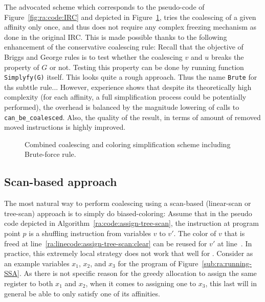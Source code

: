 {The advocated scheme which corresponds to the pseudo-code of Figure~\ref{fig:ra:code:IRC} and depicted in Figure~\ref{fig:ra:brute}, tries the coalescing of a given affinity only once, and thus does not require any complex freezing mechanism as done in the original IRC.
This is made possible thanks to the following enhancement of the conservative coalescing rule:
Recall that the objective of Briggs and George rules is to test whether the coalescing $v$ and $u$ breaks the  property of $G$ or not.
Testing this property can be done by running function \verb+Simplyfy(G)+ itself.
This looks quite a rough approach.
Thus the name \verb+Brute+ for ths subttle rule...
However, experience shows that despite its theoretically high complexity (for each affinity, a full simplification process could be potentially performed), the overhead is balanced by the magnitude lowering of calls to \verb+can_be_coalesced+.
Also, the quality of the result, in terms of amount of removed moved instructions is highly improved.


\begin{figure}
  \begin{center}
    \caption{Combined coalescing and coloring simplification scheme including Brute-force rule. \label{fig:ra:brute}}
  \end{center}
\end{figure}


\subsection{Scan-based approach}
The most natural way to perform coalescing using a scan-based (linear-scan or tree-scan) approach is to simply do biased-coloring:
Assume that in the pseudo code depicted in Algorithm~\ref{ra:code:assign-tree-scan}, the instruction at program point $p$ is a shuffling instruction from variables $v$ to $v'$.
The color of $v$ that is freed at line~\ref{ra:linecode:assign-tree-scan:clear} can be reused for $v'$ at line~\label{ra:linecode:assign-tree-scan:assign}.
In practice, this extremely local strategy does not work that well for \phifun.
Consider as an example variables $x_1$, $x_2$, and $x_3$ for the program of Figure~\ref{sub:ra:running-SSA}.
As there is not specific reason for the greedy allocation to assign the same register to both $x_1$ and $x_2$, when it comes to assigning one to $x_3$, this last will in general be able to only satisfy one of its affinities.

}
